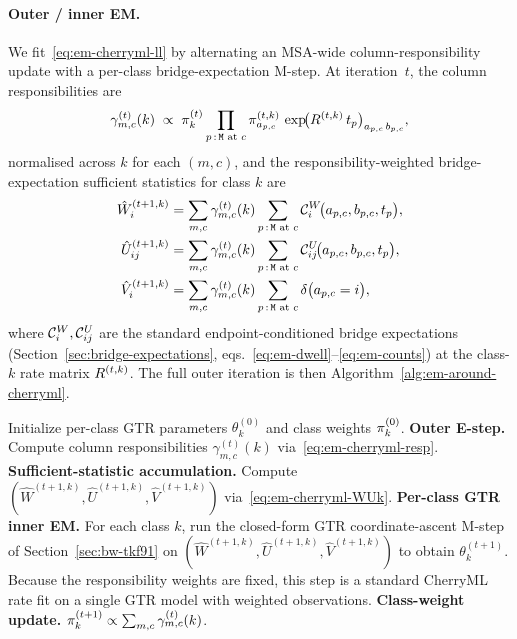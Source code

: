 \paragraph{Outer / inner EM.}
We fit~\eqref{eq:em-cherryml-ll} by alternating an MSA-wide
column-responsibility update with a per-class bridge-expectation M-step.
At iteration~$t$, the column responsibilities are
\begin{equation}\label{eq:em-cherryml-resp}
\gamma^{(t)}_{m,c}(k)
\;\propto\;
\pi^{(t)}_k
\prod_{p\,:\, {\tt M} \text{ at } c}
\pi^{(t,k)}_{a_{p,c}}\,
\exp\!\bigl(R^{(t,k)}\, t_p\bigr)_{a_{p,c}\,b_{p,c}},
\end{equation}
normalised across $k$ for each $(m, c)$, and the
responsibility-weighted bridge-expectation sufficient statistics for class
$k$ are
\begin{equation}\label{eq:em-cherryml-WUk}
\begin{aligned}
\hat W_i^{(t+1,k)}
  &= \sum_{m,c} \gamma^{(t)}_{m,c}(k)
     \sum_{p\,:\, {\tt M} \text{ at } c}
     \mathcal{C}^W_i\!\bigl(a_{p,c}, b_{p,c}, t_p\bigr),
\\
\hat U_{ij}^{(t+1,k)}
  &= \sum_{m,c} \gamma^{(t)}_{m,c}(k)
     \sum_{p\,:\, {\tt M} \text{ at } c}
     \mathcal{C}^U_{ij}\!\bigl(a_{p,c}, b_{p,c}, t_p\bigr),
\\
\hat V_i^{(t+1,k)}
  &= \sum_{m,c} \gamma^{(t)}_{m,c}(k)
     \sum_{p\,:\, {\tt M} \text{ at } c}
     \delta\bigl(a_{p,c} = i\bigr),
\end{aligned}
\end{equation}
where $\mathcal{C}^W_i, \mathcal{C}^U_{ij}$ are the standard
endpoint-conditioned bridge expectations
(Section~\ref{sec:bridge-expectations},
eqs.~\eqref{eq:em-dwell}--\eqref{eq:em-counts}) at the class-$k$
rate matrix $R^{(t,k)}$.  The full outer iteration is then
Algorithm~\ref{alg:em-around-cherryml}.
\begin{algorithm}
\caption{EM-around-CherryML for $C$ site classes.}
\label{alg:em-around-cherryml}
\begin{algorithmic}[1]
\State Initialize per-class GTR parameters $\theta^{(0)}_k$ and class
weights $\pi^{(0)}_k$.
  \State \textbf{Outer E-step.} Compute column responsibilities
  $\gamma^{(t)}_{m,c}(k)$ via~\eqref{eq:em-cherryml-resp}.
  \State \textbf{Sufficient-statistic accumulation.} Compute
  $(\hat W^{(t+1,k)}, \hat U^{(t+1,k)}, \hat V^{(t+1,k)})$
  via~\eqref{eq:em-cherryml-WUk}.
  \State \textbf{Per-class GTR inner EM.} For each class $k$, run the
  closed-form GTR coordinate-ascent M-step of
  Section~\ref{sec:bw-tkf91} on
  $(\hat W^{(t+1,k)}, \hat U^{(t+1,k)}, \hat V^{(t+1,k)})$ to obtain
  $\theta^{(t+1)}_k$.  Because the responsibility weights are fixed,
  this step is a standard CherryML rate fit on a single GTR model
  with weighted observations.
  \State \textbf{Class-weight update.}
  $\pi^{(t+1)}_k \propto \sum_{m,c} \gamma^{(t)}_{m,c}(k)$.
\EndFor
\end{algorithmic}
\end{algorithm}

